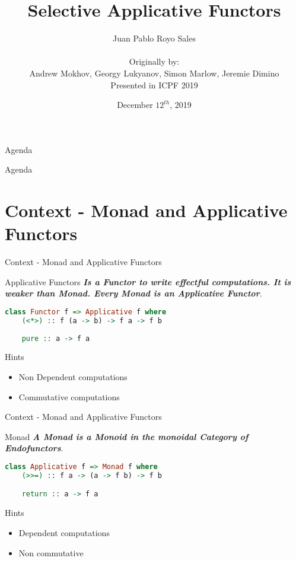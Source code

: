 \documentclass{beamer}
\title{Selective Applicative Functors}
\author{Juan Pablo Royo Sales\\
  \ \\
  \tiny{Originally by:\\
  Andrew Mokhov, Georgy Lukyanov, Simon Marlow, Jeremie Dimino\\
  Presented in ICPF 2019}
}
\institute{UPC $\sim>$ FIB $\sim>$ TMIRI}
\date{December $12^{th}$, 2019}
\begin{document}
\begin{frame}
\titlepage
\end{frame}

\begin{frame}{Agenda}
  \tableofcontents
\end{frame}

\begin{frame}{Agenda}
  \section{Context - Monad and Applicative Functors}
  \tableofcontents[currentsection]
\end{frame}

\begin{frame}[fragile]{Context - Monad and Applicative Functors}
  \begin{block}{Applicative Functors}
    \textbf{\textit{Is a Functor to write effectful computations. It is weaker
        than Monad. Every Monad is an Applicative Functor}}.\\
  \end{block}

\begin{lstlisting}[language=Haskell]
  class Functor f => Applicative f where 
    (<*>) :: f (a -> b) -> f a -> f b
    
    pure :: a -> f a
  \end{lstlisting}

  \begin{block}{Hints}
  \begin{itemize}
    \item Non Dependent computations
    \item Commutative computations
    \end{itemize}
    \end{block}
 
\end{frame}

\begin{frame}[fragile]{Context - Monad and Applicative Functors}

  \begin{block}{Monad}
    \textbf{\textit{A Monad is a Monoid in the monoidal Category of Endofunctors}}.
  \end{block}

\begin{lstlisting}[language=Haskell]
  class Applicative f => Monad f where
    (>>=) :: f a -> (a -> f b) -> f b

    return :: a -> f a
  \end{lstlisting}

  \begin{block}{Hints}
  \begin{itemize}
    \item Dependent computations
    \item Non commutative
    \end{itemize}
  \end{block}
\end{frame}
\end{document}
